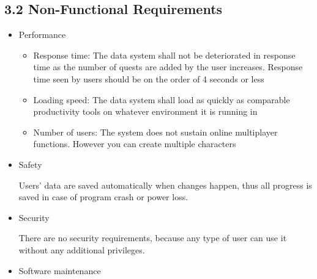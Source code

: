\documentclass[12pt]{report}
\renewcommand{\_}{\kern-1.5pt\textunderscore\kern-1.5pt}
\begin{document}
\vspace{\baselineskip}\subsection*{3.2 Non-Functional Requirements}
\begin{itemize}
	\item {\fontsize{14pt}{16.8pt}\selectfont Performance\par}\par

\begin{itemize}
	\item Response time: The data system shall not be deteriorated in response time as the number of quests are added by the user increases. Response time seen by users should be on the order of 4 seconds or less\par

	\item Loading speed: The data system shall load as quickly as comparable productivity tools on whatever environment it is running in\par

	\item Number of users: The system does not sustain online multiplayer functions. However you can create multiple characters\par


\end{itemize}
	\item {\fontsize{14pt}{16.8pt}\selectfont Safety\par}\par

Users’ data are saved automatically when changes happen, thus all progress is saved in case of program crash or power loss.\par

	\item {\fontsize{14pt}{16.8pt}\selectfont Security\par}\par

There are no security requirements, because any type of user can use it without any additional privileges.\par

	\item {\fontsize{14pt}{16.8pt}\selectfont Software maintenance\par}\par


\end{itemize}
\end{document}

